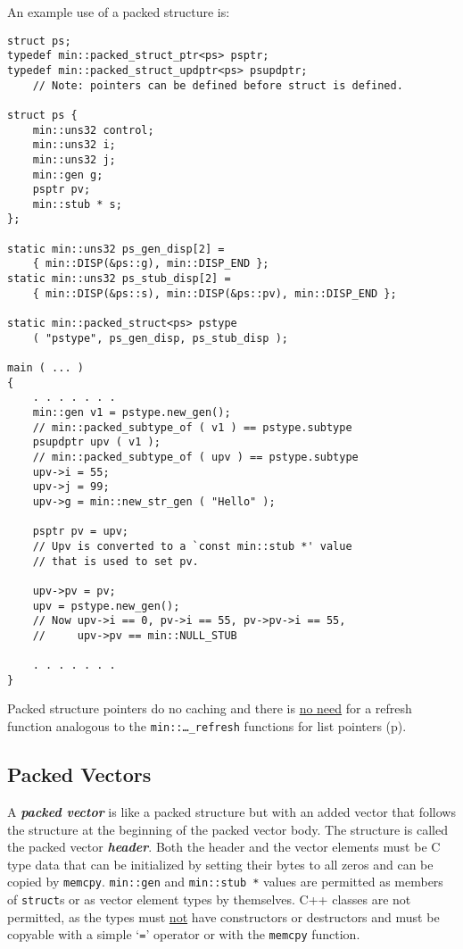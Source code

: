 \documentclass[12pt]{article}
\newcommand{\key}[1]{{\bf \em #1}\index{#1}}
\newcommand{\mkey}[2]{{\bf \em #1}\index{#1!#2}}
\newcommand{\pagref}[1]{p\pageref{#1}}
\newcommand{\EOL}{\penalty \exhyphenpenalty}
\newenvironment{indpar}[1][0.3in]%
	{\begin{list}{}%
		     {\setlength{\itemsep}{0in}%
		      \setlength{\topsep}{0in}%
		      \setlength{\parsep}{1ex}%
		      \setlength{\labelwidth}{#1}%
		      \setlength{\leftmargin}{#1}%
		      \addtolength{\leftmargin}{\labelsep}}%
	 \item}%
	{\end{list}}
\begin{document}
An example use of a packed structure is:
\begin{indpar}\begin{verbatim}
struct ps;
typedef min::packed_struct_ptr<ps> psptr;
typedef min::packed_struct_updptr<ps> psupdptr;
    // Note: pointers can be defined before struct is defined.

struct ps {
    min::uns32 control;
    min::uns32 i;
    min::uns32 j;
    min::gen g;
    psptr pv;
    min::stub * s;
};

static min::uns32 ps_gen_disp[2] =
    { min::DISP(&ps::g), min::DISP_END };
static min::uns32 ps_stub_disp[2] =
    { min::DISP(&ps::s), min::DISP(&ps::pv), min::DISP_END };

static min::packed_struct<ps> pstype
    ( "pstype", ps_gen_disp, ps_stub_disp );

main ( ... )
{
    . . . . . . .
    min::gen v1 = pstype.new_gen();
	// min::packed_subtype_of ( v1 ) == pstype.subtype
    psupdptr upv ( v1 );
	// min::packed_subtype_of ( upv ) == pstype.subtype
    upv->i = 55;
    upv->j = 99;
    upv->g = min::new_str_gen ( "Hello" );

    psptr pv = upv;
    // Upv is converted to a `const min::stub *' value
    // that is used to set pv.

    upv->pv = pv;
    upv = pstype.new_gen();
    // Now upv->i == 0, pv->i == 55, pv->pv->i == 55,
    //     upv->pv == min::NULL_STUB

    . . . . . . .
}
\end{verbatim}\end{indpar}

Packed structure pointers do no caching and
there is \underline{no need} for
a refresh function analogous to the {\tt min::\EOL \ldots\_\EOL refresh}
functions for list pointers (\pagref{LIST-POINTER-CACHE}).

\subsection{Packed Vectors}
\label{PACKED-VECTORS}

A \key{packed vector} is like a packed structure but with an added vector
that follows the structure at the beginning of the packed vector body.
The structure is called the packed vector \mkey{header}{of packed vector}.
Both the header and the vector elements must be C type data that can
be initialized by setting their bytes to all zeros and can be copied
by \verb|memcpy|.
\verb|min::gen| and \verb|min::stub *| values are permitted as members
of \verb|struct|s or as vector element types by themselves.
C++ classes are not permitted, as the types must \underline{not}
have constructors or destructors and must be copyable with
a simple `{\tt =}' operator or with the \verb|memcpy| function.
\end{document}
